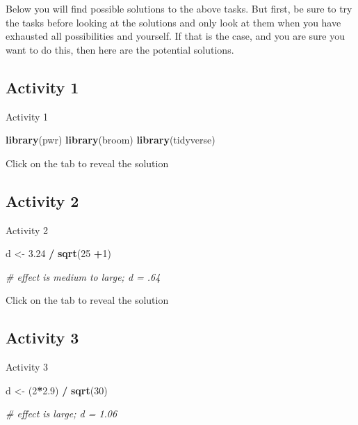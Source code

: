 \documentclass[]{book}
\newenvironment{Shaded}{\begin{snugshade}}{\end{snugshade}}
\newcommand{\CommentTok}[1]{\textcolor[rgb]{0.56,0.35,0.01}{\textit{#1}}}
\newcommand{\DecValTok}[1]{\textcolor[rgb]{0.00,0.00,0.81}{#1}}
\newcommand{\FloatTok}[1]{\textcolor[rgb]{0.00,0.00,0.81}{#1}}
\newcommand{\KeywordTok}[1]{\textcolor[rgb]{0.13,0.29,0.53}{\textbf{#1}}}
\newcommand{\NormalTok}[1]{#1}
\newcommand{\OperatorTok}[1]{\textcolor[rgb]{0.81,0.36,0.00}{\textbf{#1}}}
\newcommand{\StringTok}[1]{\textcolor[rgb]{0.31,0.60,0.02}{#1}}
\begin{document}
Below you will find possible solutions to the above tasks. But first, be sure to try the tasks before looking at the solutions and only look at them when you have exhausted all possibilities and yourself. If that is the case, and you are sure you want to do this, then here are the potential solutions.

\hypertarget{activity-1-4}{%
\subsection{Activity 1}\label{activity-1-4}}

Activity 1

\begin{Shaded}
\begin{Highlighting}[]
\KeywordTok{library}\NormalTok{(pwr)}
\KeywordTok{library}\NormalTok{(broom)}
\KeywordTok{library}\NormalTok{(tidyverse)}
\end{Highlighting}
\end{Shaded}

Click on the tab to reveal the solution

\hypertarget{activity-2-2}{%
\subsection{Activity 2}\label{activity-2-2}}

Activity 2

\begin{Shaded}
\begin{Highlighting}[]
\NormalTok{d <-}\StringTok{ }\FloatTok{3.24} \OperatorTok{/}\StringTok{ }\KeywordTok{sqrt}\NormalTok{(}\DecValTok{25} \OperatorTok{+}\DecValTok{1}\NormalTok{)}

\CommentTok{# effect is medium to large; d = .64}
\end{Highlighting}
\end{Shaded}

Click on the tab to reveal the solution

\hypertarget{activity-3-3}{%
\subsection{Activity 3}\label{activity-3-3}}

Activity 3

\begin{Shaded}
\begin{Highlighting}[]
\NormalTok{d <-}\StringTok{ }\NormalTok{(}\DecValTok{2}\OperatorTok{*}\FloatTok{2.9}\NormalTok{) }\OperatorTok{/}\StringTok{ }\KeywordTok{sqrt}\NormalTok{(}\DecValTok{30}\NormalTok{)}

\CommentTok{# effect is large; d = 1.06}
\end{Highlighting}
\end{Shaded}
\end{document}
